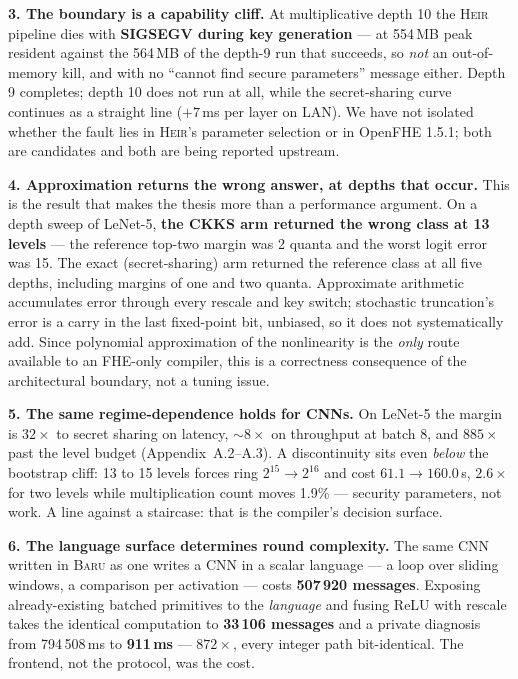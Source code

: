\documentclass[10pt]{article}
\newcommand{\baru}{\textsc{Baru}}
\newcommand{\heir}{\textsc{Heir}}
\begin{document}
\medskip
\noindent\textbf{3. The boundary is a capability cliff.} At multiplicative depth 10 the \heir{} pipeline dies with \textbf{SIGSEGV
during key generation} --- at 554\,MB peak resident against the 564\,MB of the
depth-9 run that succeeds, so \emph{not} an out-of-memory kill, and with no
``cannot find secure parameters'' message either. Depth 9 completes; depth 10
does not run at all, while the secret-sharing curve continues as a straight line
($+7$\,ms per layer on LAN). We have not isolated whether the fault lies in
\heir{}'s parameter selection or in OpenFHE 1.5.1; both are candidates and both
are being reported upstream.

\medskip
\noindent\textbf{4. Approximation returns the wrong answer, at depths that occur.}
This is the result that makes the thesis more than a performance argument. On a
depth sweep of LeNet-5, \textbf{the CKKS arm returned the wrong class at 13
levels} --- the reference top-two margin was 2 quanta and the worst logit error
was 15. The exact (secret-sharing) arm returned the reference class at all five
depths, including margins of one and two quanta. Approximate arithmetic
accumulates error through every rescale and key switch; stochastic truncation's
error is a carry in the last fixed-point bit, unbiased, so it does not
systematically add. Since polynomial approximation of the nonlinearity is the
\emph{only} route available to an FHE-only compiler, this is a correctness
consequence of the architectural boundary, not a tuning issue.

\medskip
\noindent\textbf{5. The same regime-dependence holds for CNNs.} On LeNet-5 the
margin is $32\times$ to secret sharing on latency, ${\sim}8\times$ on throughput
at batch 8, and $885\times$ past the level budget (Appendix~A.2--A.3). A
discontinuity sits even \emph{below} the bootstrap cliff: 13 to 15 levels forces
ring $2^{15}\!\to\!2^{16}$ and cost $61.1 \to 160.0$\,s, $2.6\times$ for two
levels while multiplication count moves 1.9\% --- security parameters, not work.
A line against a staircase: that is the compiler's decision surface.

\medskip
\noindent\textbf{6. The language surface determines round complexity.} The same
CNN written in \baru{} as one writes a CNN in a scalar language --- a loop over
sliding windows, a comparison per activation --- costs \textbf{507\,920
messages}. Exposing already-existing batched primitives to the \emph{language}
and fusing ReLU with rescale takes the identical computation to \textbf{33\,106
messages} and a private diagnosis from 794\,508\,ms to \textbf{911\,ms} ---
$872\times$, every integer path bit-identical. The frontend, not the protocol,
was the cost.
\end{document}
